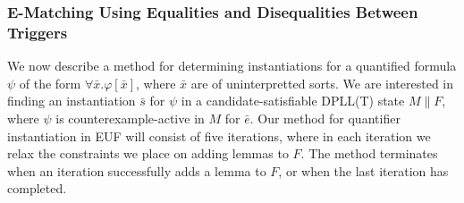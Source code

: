 \documentclass{llncs}
\begin{document}
\begin{comment}

Given a term $t \in T( \Sigma, \mathcal{I}( \psi ) )$, we say that $t$ is \emph{unmatchable} in $M$ if all terms $t'$ in $M$ are equality-independent from $t$.
A literal $t \sim s$ is unmatchable if either $t$ or $s$ is unmatchable.
Otherwise, for a literal $t \sim s$, consider the case when $s$ does not contain instantiation constants.
We will be interested in finding a corresponding concrete ground term, call it $t_{\sim s}$, that represents the best match for $t$ with regard to literal $t \sim s$.
We require that $t$ and $t_{\sim s}$ are equality-dependent.
Formally, define $t_{\sim s}$ as the term in $M$ that is maximal with respect to the following metrics in descending order of importance: 

(1) $M \not\models_T t_{\sim s} \not\sim s$, 

(2) $M \models_T t_{\sim s} \sim s$,

(3) $t \sim t_{\sim s}$ is $E$-induced in $M$ for some $E$,

(4) minimum value of $NeqArgs_M( t, t_{\sim s} )$.

In the case that we have a matchable literal $t \sim s$ where both $t$ and $s$ contain instantiation constants, we define $t_{\sim s}$ and $s_{\sim t}$ similarly.
In the case that $M \models_T t_{\sim s} \sim s_{\sim t}$, we say that $t \sim s$ is \emph{literal-matched}, that is, a candidate match at the literal level has been found.
\end{comment}

\subsubsection{E-Matching Using Equalities and Disequalities Between Triggers}

We now describe a method for determining instantiations for a quantified formula $\psi$ of the form $\forall \bar{x}. \varphi[\bar{x}]$, where $\bar{x}$ are of uninterpretted sorts.
We are interested in finding an instantiation $\bar{s}$ for $\psi$ in a candidate-satisfiable DPLL(T) state $M \parallel F$, where $\psi$ is counterexample-active in $M$ for $\bar{e}$.
Our method for quantifier instantiation in EUF will consist of five iterations, where in each iteration we relax the constraints we place on adding lemmas to $F$.
The method terminates when an iteration successfully adds a lemma to $F$, or when the last iteration has completed.
\end{document}
